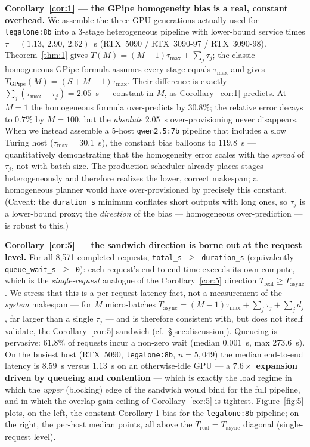 \documentclass[11pt]{article}
\begin{document}
\textbf{Corollary~\ref{cor:1} --- the GPipe homogeneity bias is a real, constant overhead.} We assemble the three GPU generations actually used for \texttt{legalone:8b} into a 3-stage heterogeneous pipeline with lower-bound service times $\tau = (1.13,\ 2.90,\ 2.62)$~s (RTX~5090 / RTX~3090-97 / RTX~3090-98). Theorem~\ref{thm:1} gives $T(M) = (M-1)\tau_{\max} + \sum_j\tau_j$; the classic homogeneous GPipe formula assumes every stage equals $\tau_{\max}$ and gives $T_{\text{GPipe}}(M) = (S+M-1)\tau_{\max}$. Their difference is exactly $\sum_j(\tau_{\max}-\tau_j) = 2.05$~s --- constant in $M$, as Corollary~\ref{cor:1} predicts. At $M=1$ the homogeneous formula over-predicts by $30.8\%$; the relative error decays to $0.7\%$ by $M=100$, but the \emph{absolute} 2.05~s over-provisioning never disappears. When we instead assemble a 5-host \texttt{qwen2.5:7b} pipeline that includes a slow Turing host ($\tau_{\max}=30.1$~s), the constant bias balloons to $119.8$~s --- quantitatively demonstrating that the homogeneity error scales with the \emph{spread} of $\tau_j$, not with batch size. The production scheduler already places stages heterogeneously and therefore realizes the lower, correct makespan; a homogeneous planner would have over-provisioned by precisely this constant. (Caveat: the \texttt{duration\_s} minimum conflates short outputs with long ones, so $\tau_j$ is a lower-bound proxy; the \emph{direction} of the bias --- homogeneous over-prediction --- is robust to this.)

\textbf{Corollary~\ref{cor:5} --- the sandwich direction is borne out at the request level.} For all 8,571 completed requests, \texttt{total\_s $\ge$ duration\_s} (equivalently \texttt{queue\_wait\_s $\ge$ 0}): each request's end-to-end time exceeds its own compute, which is the \emph{single-request} analogue of the Corollary~\ref{cor:5} direction $T_{\text{real}} \ge T_{\text{async}}$. We stress that this is a per-request latency fact, not a measurement of the \emph{system} makespan --- for $M$ micro-batches $T_{\text{async}}=(M-1)\tau_{\max}+\sum_j\tau_j+\sum_j d_j$, far larger than a single $\tau_j$ --- and is therefore consistent with, but does not itself validate, the Corollary~\ref{cor:5} sandwich (cf.\ \S\ref{sec:discussion}). Queueing is pervasive: $61.8\%$ of requests incur a non-zero wait (median $0.001$~s, max $273.6$~s). On the busiest host (RTX~5090, \texttt{legalone:8b}, $n=5{,}049$) the median end-to-end latency is $8.59$~s versus $1.13$~s on an otherwise-idle GPU --- a \textbf{$7.6\times$ expansion driven by queueing and contention} --- which is exactly the load regime in which the \emph{upper} (blocking) edge of the sandwich would bind for the full pipeline, and in which the overlap-gain ceiling of Corollary~\ref{cor:5} is tightest. Figure~\ref{fig:5} plots, on the left, the constant Corollary-1 bias for the \texttt{legalone:8b} pipeline; on the right, the per-host median points, all above the $T_{\text{real}} = T_{\text{async}}$ diagonal (single-request level).
\end{document}

